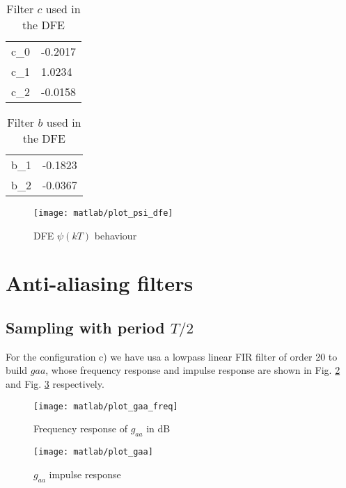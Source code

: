 \documentclass[a4paper,oneside]{article}
\begin{document}
\begin{table}
  \centering
\begin{tabular}{LL}
  c_0 & -0.2017 \\
  c_1 & 1.0234 \\
  c_2 & -0.0158
\end{tabular}
\caption{Filter $c$ used in the DFE}
\label{tab:c_dfe}
\end{table}
\begin{table}
  \centering
\begin{tabular}{LL}
  b_1 & -0.1823 \\
  b_2 & -0.0367
\end{tabular}
\caption{Filter $b$ used in the DFE}
\label{tab:b_dfe}
\end{table}

\begin{figure}[h]
  \centering
  \texttt{[image: matlab/plot\_psi\_dfe]}
  \caption{DFE $\psi(kT)$ behaviour}
  \label{plot:psi_dfe_1}
\end{figure}



\section{Anti-aliasing filters}

\subsection{Sampling with period $T/2$}
For the configuration c) we have usa a lowpass linear FIR filter of order 20 to build $gaa$, whose frequency response and impulse response are shown in Fig. \ref{plot:Gaa2} and Fig. \ref{plot:gaa2} respectively. 
\begin{figure}[h]
  \centering
  \texttt{[image: matlab/plot\_gaa\_freq]}
  \caption{Frequency response of $g_{aa}$ in dB}
  \label{plot:Gaa2}
\end{figure}
\begin{figure}[h]
  \centering
  \texttt{[image: matlab/plot\_gaa]}
  \caption{$g_{aa}$ impulse response}
  \label{plot:gaa2}
\end{figure}

 
\end{document}
